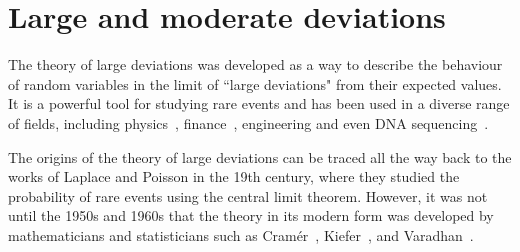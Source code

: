 \section{Large and moderate deviations}\label{sec:LargeDevIntro}



The theory of large deviations was developed as a way to describe the behaviour of random variables in the limit of ``large deviations" from their expected values. It is a powerful tool for studying rare events and has been used in a diverse range of fields, including physics~\cite{Ellis2006EntropyMechanics}, finance~\cite{Friz2015LargeFinance}, engineering and even DNA sequencing~\cite{Dembo2010LargeApplications}.


The origins of the theory of large deviations can be traced all the way back to the works of Laplace and Poisson in the 19th century, where they studied the probability of rare events using the central limit theorem. However, it was not until the 1950s and 1960s that the theory in its modern form was developed by mathematicians and statisticians such as Cramér~\cite{Cramer1938SurProbabilites}, Kiefer~\cite{Kiefer1961OnLogarithm}, and Varadhan~\cite{Varadhan1967DiffusionInterval}.

